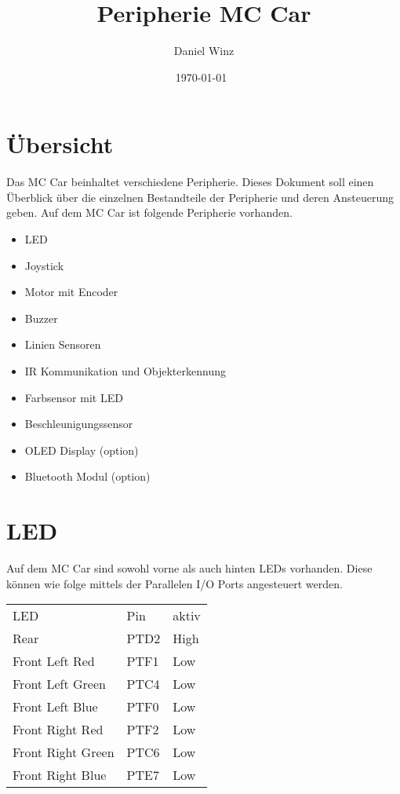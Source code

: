 \documentclass[a4paper,10pt,fleqn]{article}
\title{Peripherie MC Car}
\author{Daniel Winz}
\date{\today~\dtc}
\begin{document}
\maketitle

\newpage

\tableofcontents

\newpage

\section{Übersicht}
Das MC Car beinhaltet verschiedene Peripherie. Dieses Dokument soll einen 
Überblick über die einzelnen Bestandteile der Peripherie und deren Ansteuerung 
geben. Auf dem MC Car ist folgende Peripherie vorhanden. 
\begin{itemize}
  \item LED
  \item Joystick
  \item Motor mit Encoder
  \item Buzzer
  \item Linien Sensoren
  \item IR Kommunikation und Objekterkennung
  \item Farbsensor mit LED
  \item Beschleunigungssensor
  \item OLED Display (option)
  \item Bluetooth Modul (option)
\end{itemize}

\section{LED}
Auf dem MC Car sind sowohl vorne als auch hinten LEDs vorhanden. Diese können 
wie folge mittels der Parallelen I/O Ports angesteuert werden. \\
\begin{table}[h!]
\begin{tabular}{lll}
\rowcolor{white} LED                 & Pin   & aktiv \\
\rowcolor{lgray} Rear                & PTD2  & High  \\
\rowcolor{white} Front Left  Red     & PTF1  & Low   \\
\rowcolor{lgray} Front Left  Green   & PTC4  & Low   \\
\rowcolor{white} Front Left  Blue    & PTF0  & Low   \\
\rowcolor{lgray} Front Right Red     & PTF2  & Low   \\
\rowcolor{white} Front Right Green   & PTC6  & Low   \\
\rowcolor{lgray} Front Right Blue    & PTE7  & Low   \\
\end{tabular}
\end{table}
\end{document}
